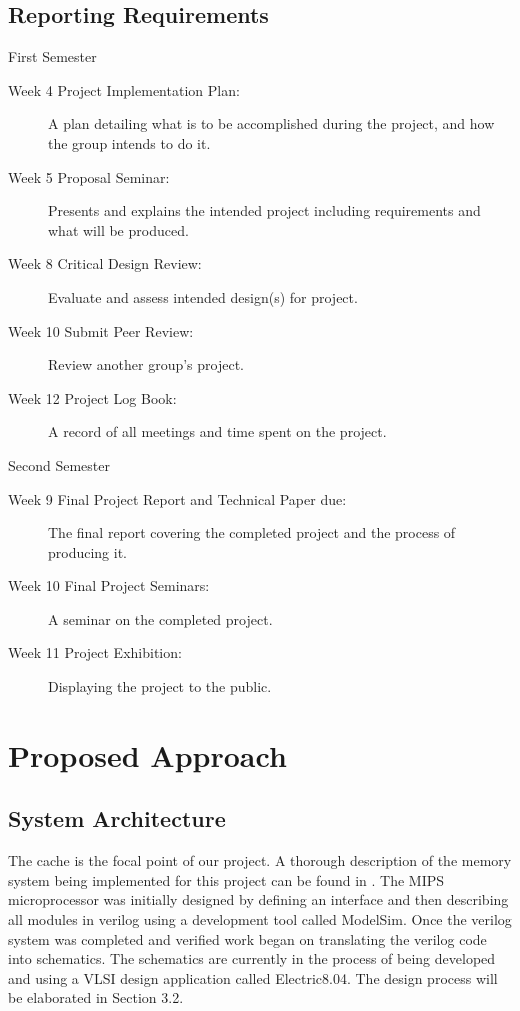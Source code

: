 \documentclass[a4paper,12pt]{article}
\begin{document}
\subsection{Reporting Requirements}

First Semester
\begin{description}
\item[Week 4 Project Implementation Plan:] A plan detailing what is to
  be accomplished during the project, and how the group intends to do
  it.
\item[Week 5 Proposal Seminar:] Presents and explains the intended
  project including requirements and what will be produced.
\item[Week 8 Critical Design Review:] Evaluate and assess intended
  design(s) for project.
\item[Week 10 Submit Peer Review:] Review another group's project.
\item[Week 12 Project Log Book:] A record of all meetings and time
  spent on the project.
\end{description}

Second Semester
\begin{description}
\item[Week 9 Final Project Report and Technical Paper due:] The final
report covering the completed project and the process of producing it.
\item[Week 10 Final Project Seminars:] A seminar on the completed
project.  
\item[Week 11 Project Exhibition:] Displaying the project to the
public.
\end{description}

%

\section{Proposed Approach}

\subsection{System Architecture}

The cache is the focal point of our project. A thorough description of
the memory system being implemented for this project can be found in
\cite{various07}. The MIPS microprocessor was initially designed
by defining an interface and then describing all modules in verilog
using a development tool called ModelSim. Once the verilog system was
completed and verified work began on translating the verilog code into
schematics. The schematics are currently in the process of being
developed and using a VLSI design application called Electric8.04. The
design process will be elaborated in Section 3.2.
\end{document}
